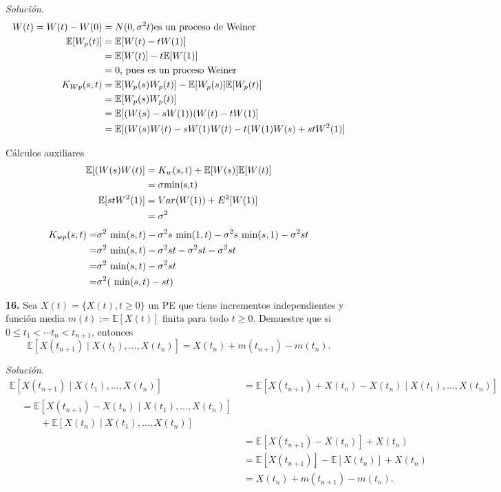 \documentclass[12pt]{article}
\newcommand{\E}{\mathbb{E}}
\begin{document}
\textit{Solución}.
\begin{align*}
    W(t) = W(t) - W(0) &= N(0, \sigma^{2}t) \textnormal{es un proceso de Weiner}\\
    \E[W_p(t)] &= \E[W(t) - tW(1)]\\
    &= \E[W(t)] - t\E[W(1)] \\
    &= 0 \textnormal{, pues es un proceso Weiner}\\ 
    K_{Wp}(s,t) &= \E[W_p(s) W_p(t)] - \E[W_p(s)]\E[W_p(t)]\\
    &= \E [W_p(s) W_p(t)] \\
    &= \E [(W(s)-sW(1))(W(t)-tW(1)]\\
    &= \E [(W(s)W(t)-sW(1)W(t)-t(W(1)W(s)+stW^{2}(1)]
\end{align*}

Cálculos auxiliares
\begin{align*}
\E [(W(s)W(t)] &= K_w(s,t) + \E[W(s)]\E[W(t)]\\
&= \sigma \textnormal{min(s,t)}\\
\E[stW^{2}(1)] &= Var(W(1)) + E^{2}[W(1)]\\
&= \sigma^{2}
\end{align*}
\begin{align*}
K_{wp}(s,t) =  & \sigma^{2} \textnormal{ min}(s,t) - \sigma^{2} s \textnormal{ min}(1,t) - \sigma^{2} s \textnormal{ min}(s,1)-\sigma^{2}st \\
=  & \sigma^{2} \textnormal{ min}(s,t) - \sigma^{2} st - \sigma^{2} st-\sigma^{2}st \\
=  & \sigma^{2} \textnormal{ min}(s,t) - \sigma^{2} st\\
=  & \sigma^{2}( \textnormal{ min}(s,t) - st)
\end{align*}

\begin{tcolorbox}[colback=blue!5!white, colframe=blue!5!white, arc=0mm, boxrule=0pt]
    \textbf{16.} Sea $X(t) = \{X(t), t \geq 0\}$ un PE que tiene incrementos independientes y función media $m(t) := \E[X(t)]$ finita para todo $t\geq 0$. Demuestre que si $0 \leq t_1 < \cdots t_n < t_{n+1}$, entonces
    \[ \E[X(t_{n+1}) \mid X(t_1), \ldots, X(t_n)] = X(t_n) + m(t_{n+1}) - m(t_n). \]
\end{tcolorbox} 

\noindent
\textit{Solución}. 
\begin{align*}
    \E[X(t_{n+1}) \mid X(t_1), \ldots, X(t_n)] &= \E[X(t_{n+1}) + X(t_n) - X(t_n) \mid X(t_1), \ldots, X(t_n)] \\
    \begin{split}
    &= \E[X(t_{n+1}) - X(t_n) \mid X(t_1), \ldots, X(t_n)] \\
        & \quad \quad + \E[X(t_n)\mid X(t_1), \ldots, X(t_n)]
    \end{split}  \\
    &= \E[X(t_{n+1}) - X(t_n)] + X(t_n) \\
    &= \E[X(t_{n+1})] - \E[X(t_n)] + X(t_n) \\
    &= X(t_n) + m(t_{n+1}) - m(t_n).
\end{align*}
\end{document}
